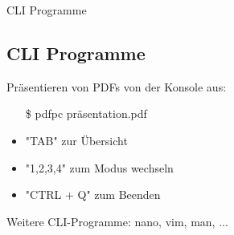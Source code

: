 \begin{frame}{CLI Programme}
    \subsection{CLI Programme}\label{subsec:cli-programme}

    Präsentieren von PDFs von der Konsole aus:

    \begin{itemize}
        \item[\$] pdfpc präsentation.pdf
        \item "TAB" zur Übersicht
        \item "1,2,3,4" zum Modus wechseln
        \item "CTRL + Q" zum Beenden
    \end{itemize}

    Weitere CLI-Programme: nano, vim, man, ...

\end{frame}
